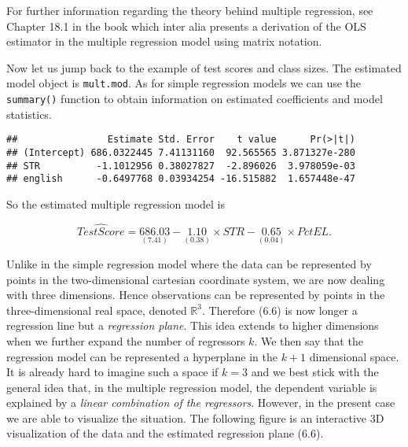 \documentclass[]{book}
\newenvironment{Shaded}{\begin{snugshade}}{\end{snugshade}}
\newcommand{\KeywordTok}[1]{\textcolor[rgb]{0.13,0.29,0.53}{\textbf{#1}}}
\newcommand{\OperatorTok}[1]{\textcolor[rgb]{0.81,0.36,0.00}{\textbf{#1}}}
\newcommand{\NormalTok}[1]{#1}
\theoremstyle{definition}
\theoremstyle{definition}
\theoremstyle{definition}
\theoremstyle{remark}
\begin{document}
 For further information regarding the theory behind multiple
regression, see Chapter 18.1 in the book which inter alia presents a
derivation of the OLS estimator in the multiple regression model using
matrix notation.

Now let us jump back to the example of test scores and class sizes. The
estimated model object is \texttt{mult.mod}. As for simple regression
models we can use the \texttt{summary()} function to obtain information
on estimated coefficients and model statistics.

\begin{Shaded}
\end{Shaded}

\begin{verbatim}
##                Estimate Std. Error    t value      Pr(>|t|)
## (Intercept) 686.0322445 7.41131160  92.565565 3.871327e-280
## STR          -1.1012956 0.38027827  -2.896026  3.978059e-03
## english      -0.6497768 0.03934254 -16.515882  1.657448e-47
\end{verbatim}

So the estimated multiple regression model is

\[ \widehat{TestScore} = \underset{(7.41)}{686.03} - \underset{(0.38)}{1.10} \times STR - \underset{(0.04)}{0.65} \times PctEL \tag{6.6}.  \]

Unlike in the simple regression model where the data can be represented
by points in the two-dimensional cartesian coordinate system, we are now
dealing with three dimensions. Hence observations can be represented by
points in the three-dimensional real space, denoted \(\mathbb{R}^3\).
Therefore (6.6) is now longer a regression line but a \emph{regression
plane}. This idea extends to higher dimensions when we further expand
the number of regressors \(k\). We then say that the regression model
can be represented a hyperplane in the \(k+1\) dimensional space. It is
already hard to imagine such a space if \(k=3\) and we best stick with
the general idea that, in the multiple regression model, the dependent
variable is explained by a \emph{linear combination of the regressors}.
However, in the present case we are able to visualize the situation. The
following figure is an interactive 3D visualization of the data and the
estimated regression plane (6.6).

\hypertarget{1725e1ca1aa8a}{}
\end{document}
